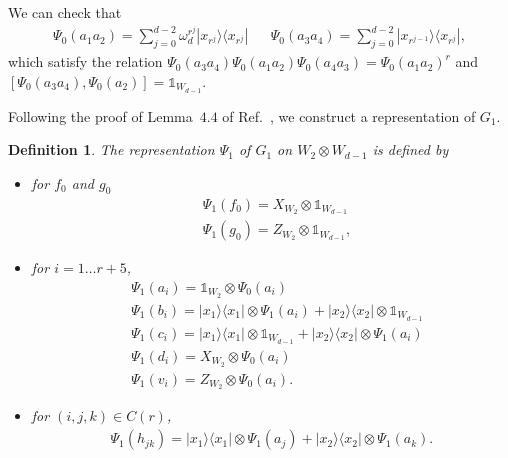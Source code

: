 \documentclass[11pt,letterpaper]{article}
\newcommand{\ketbra}[2]{|#1\rangle\langle#2|}
\newcommand{\x}{\otimes}
\newcommand{\1}{\mathbb{1}}
\newtheorem{definition}[theorem]{Definition}
\theoremstyle{definition}
\begin{document}
We can check that
\begin{align}
	\Psi_0(a_1a_2) =  \sum_{j=0}^{d-2} \omega_d^{r^j} \ketbra{x_{r^j}}{x_{r^j}} &&
	\Psi_0(a_3a_4) =  \sum_{j=0}^{d-2} \ketbra{x_{r^{j-1}}}{x_{r^j}},
\end{align}
which satisfy the relation $\Psi_0(a_3a_4) \Psi_0(a_1a_2) \Psi_0(a_4a_3) = \Psi_0(a_1a_2)^r$ and
$[\Psi_0(a_3a_4), \Psi_0(a_2)] = \1_{W_{d-1}}$. 

Following the proof of Lemma~$4.4$ of Ref.~\cite{slofstra2017}, we construct a representation of $G_1$.
\begin{definition}
The representation $\Psi_1$ of $G_1$ on $W_2 \x W_{d-1}$ is defined by
\begin{itemize}
\item for $f_0$ and $g_0$
\begin{align*}
	&\Psi_1(f_0) = X_{W_2} \x \1_{W_{d-1}} \\
	&\Psi_1(g_0) = Z_{W_2} \x \1_{W_{d-1}},
\end{align*}
\item
for $i = 1 \dots r+5$,
\begin{align*}
	&\Psi_1(a_i) = \1_{W_2} \x \Psi_0(a_i) \\
	&\Psi_1(b_i) = \ketbra{x_1}{x_1} \x \Psi_1(a_i) + \ketbra{x_2}{x_2} \x \1_{W_{d-1}} \\
	&\Psi_1(c_i) =\ketbra{x_1}{x_1} \x \1_{W_{d-1}} + \ketbra{x_2}{x_2} \x \Psi_1(a_i) \\
	&\Psi_1(d_i) =  X_{W_2} \x \Psi_0(a_i)\\
	&\Psi_1(v_i) = Z_{W_2} \x \Psi_0(a_i).
\end{align*}
\item for $(i,j,k) \in C(r)$,
\begin{align*}
	\Psi_1(h_{jk}) = \ketbra{x_1}{x_1} \x \Psi_1(a_j) + \ketbra{x_2}{x_2} \x \Psi_1(a_k).
\end{align*}
\end{itemize}
\end{definition}
\end{document}
